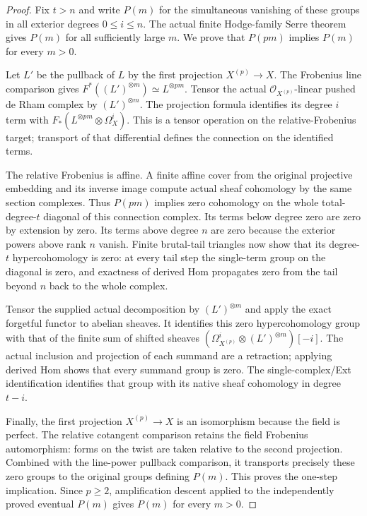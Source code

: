 \begin{proof}
Fix $t>n$ and write $P(m)$ for the simultaneous vanishing of these
groups in all exterior degrees $0\leq i\leq n$.  The actual finite
Hodge-family Serre theorem gives $P(m)$ for all sufficiently large
$m$.  We prove that $P(pm)$ implies $P(m)$ for every $m>0$.

Let $L'$ be the pullback of $L$ by the first projection
$X^{(p)}\to X$.  The Frobenius line comparison gives
$F^*((L')^{\otimes m})\simeq L^{\otimes pm}$.  Tensor the actual
$\mathcal O_{X^{(p)}}$-linear pushed de Rham complex by
$(L')^{\otimes m}$.  The projection formula identifies its degree
$i$ term with $F_*(L^{\otimes pm}\otimes\Omega_X^i)$.
This is a tensor operation on the relative-Frobenius target;
transport of that differential defines the connection on the
identified terms.

The relative Frobenius is affine.  A finite affine cover from the
original projective embedding and its inverse image compute actual
sheaf cohomology by the same section complexes.  Thus $P(pm)$ implies
zero cohomology on the whole total-degree-$t$ diagonal of this
connection complex.  Its terms below degree zero are zero by extension
by zero.  Its terms above degree $n$ are zero because the exterior
powers above rank $n$ vanish.  Finite brutal-tail triangles now show
that its degree-$t$ hypercohomology is zero: at every tail step the
single-term group on the diagonal is zero, and exactness of derived
Hom propagates zero from the tail beyond $n$ back to the whole complex.

Tensor the supplied actual decomposition by $(L')^{\otimes m}$ and
apply the exact forgetful functor to abelian sheaves.  It identifies
this zero hypercohomology group with that of the finite sum of shifted
sheaves $(\Omega_{X^{(p)}}^i\otimes(L')^{\otimes m})[-i]$.
The actual inclusion and projection of each summand are a retraction;
applying derived Hom shows that every summand group is zero.  The
single-complex/Ext identification identifies that group with its
native sheaf cohomology in degree $t-i$.

Finally, the first projection $X^{(p)}\to X$ is an isomorphism because
the field is perfect.  The relative cotangent comparison retains the
field Frobenius automorphism: forms on the twist are taken relative
to the second projection.  Combined with the line-power pullback
comparison, it transports precisely these zero groups to the
original groups defining $P(m)$.  This proves the one-step implication.
Since $p\geq2$, amplification descent applied to the independently
proved eventual $P(m)$ gives $P(m)$ for every $m>0$.
\end{proof}

